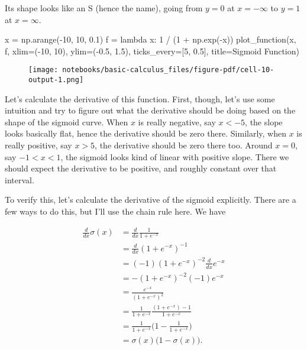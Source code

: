 \documentclass[
  letterpaper,
  DIV=11,
  numbers=noendperiod]{scrreprt}
\newenvironment{Shaded}{\begin{snugshade}}{\end{snugshade}}
\newcommand{\DecValTok}[1]{\textcolor[rgb]{0.68,0.00,0.00}{#1}}
\newcommand{\FloatTok}[1]{\textcolor[rgb]{0.68,0.00,0.00}{#1}}
\newcommand{\KeywordTok}[1]{\textcolor[rgb]{0.00,0.23,0.31}{#1}}
\newcommand{\NormalTok}[1]{\textcolor[rgb]{0.00,0.23,0.31}{#1}}
\newcommand{\OperatorTok}[1]{\textcolor[rgb]{0.37,0.37,0.37}{#1}}
\newcommand{\StringTok}[1]{\textcolor[rgb]{0.13,0.47,0.30}{#1}}
\begin{document}
Its shape looks like an S (hence the name), going from \(y=0\) at
\(x=-\infty\) to \(y=1\) at \(x=\infty\).

\begin{Shaded}
\begin{Highlighting}[]
\NormalTok{x }\OperatorTok{=}\NormalTok{ np.arange(}\OperatorTok{{-}}\DecValTok{10}\NormalTok{, }\DecValTok{10}\NormalTok{, }\FloatTok{0.1}\NormalTok{)}
\NormalTok{f }\OperatorTok{=} \KeywordTok{lambda}\NormalTok{ x:  }\DecValTok{1} \OperatorTok{/}\NormalTok{ (}\DecValTok{1} \OperatorTok{+}\NormalTok{ np.exp(}\OperatorTok{{-}}\NormalTok{x))}
\NormalTok{plot\_function(x, f, xlim}\OperatorTok{=}\NormalTok{(}\OperatorTok{{-}}\DecValTok{10}\NormalTok{, }\DecValTok{10}\NormalTok{), ylim}\OperatorTok{=}\NormalTok{(}\OperatorTok{{-}}\FloatTok{0.5}\NormalTok{, }\FloatTok{1.5}\NormalTok{), ticks\_every}\OperatorTok{=}\NormalTok{[}\DecValTok{5}\NormalTok{, }\FloatTok{0.5}\NormalTok{], title}\OperatorTok{=}\StringTok{\textquotesingle{}Sigmoid Function\textquotesingle{}}\NormalTok{)}
\end{Highlighting}
\end{Shaded}

\begin{figure}[H]

{\centering \texttt{[image: notebooks/basic-calculus\_files/figure-pdf/cell-10-output-1.png]}

}

\end{figure}

Let's calculate the derivative of this function. First, though, let's
use some intuition and try to figure out what the derivative should be
doing based on the shape of the sigmoid curve. When \(x\) is really
negative, say \(x < -5\), the slope looks basically flat, hence the
derivative should be zero there. Similarly, when \(x\) is really
positive, say \(x > 5\), the derivative should be zero there too. Around
\(x=0\), say \(-1 < x < 1\), the sigmoid looks kind of linear with
positive slope. There we should expect the derivative to be positive,
and roughly constant over that interval.

To verify this, let's calculate the derivative of the sigmoid
explicitly. There are a few ways to do this, but I'll use the chain rule
here. We have

\begin{align}
\frac{d}{dx} \sigma(x) &= \frac{d}{dx} \frac{1}{1 + e^{-x}}\\
&= \frac{d}{dx} (1 + e^{-x})^{-1} \\
&= (-1) (1 + e^{-x})^{-2} \frac{d}{dx} e^{-x} \\
&= -(1 + e^{-x})^{-2} (-1) e^{-x} \\
&= \frac{e^{-x}}{(1 + e^{-x})^{2}} \\
&= \frac{1}{1 + e^{-x}} \frac{(1 + e^{-x}) - 1}{1 + e^{-x}} \\
&= \frac{1}{1 + e^{-x}} \bigg(1-\frac{1}{1 + e^{-x}}\bigg) \\
&= \sigma(x) \big(1 - \sigma(x)\big).
\end{align}
\end{document}
